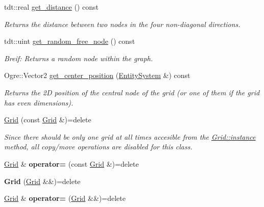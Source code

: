 \begin{DoxyCompactItemize}
tdt\+::real \hyperlink{class_grid_a33f2b46b962d2d6bd0681c2d733ab76a}{get\+\_\+distance} () const 
\begin{DoxyCompactList}\small\item\em Returns the distance between two nodes in the four non-\/diagonal directions. \end{DoxyCompactList}\item 
tdt\+::uint \hyperlink{class_grid_a66fe6e5d96f6ba442605175b2f0e3d93}{get\+\_\+random\+\_\+free\+\_\+node} () const 
\begin{DoxyCompactList}\small\item\em Breif\+: Returns a random node within the graph. \end{DoxyCompactList}\item 
Ogre\+::\+Vector2 \hyperlink{class_grid_ad31b555e83f82a18c1c4a483bf1e57e5}{get\+\_\+center\+\_\+position} (\hyperlink{class_entity_system}{Entity\+System} \&) const 
\begin{DoxyCompactList}\small\item\em Returns the 2D position of the central node of the grid (or one of them if the grid has even dimensions). \end{DoxyCompactList}\item 
\hyperlink{class_grid_a4ec1287c8c59bbcb98f63d50260f6331}{Grid} (const \hyperlink{class_grid}{Grid} \&)=delete
\begin{DoxyCompactList}\small\item\em Since there should be only one grid at all times accesible from the \hyperlink{class_grid_a6ce0a23ca91244b4eee86ba8072cb56d}{Grid\+::instance} method, all copy/move operations are disabled for this class. \end{DoxyCompactList}\item 
\hyperlink{class_grid}{Grid} \& {\bfseries operator=} (const \hyperlink{class_grid}{Grid} \&)=delete\hypertarget{class_grid_afbc27641c46e4ec7adf05e37cd908539}{}\label{class_grid_afbc27641c46e4ec7adf05e37cd908539}

\item 
{\bfseries Grid} (\hyperlink{class_grid}{Grid} \&\&)=delete\hypertarget{class_grid_a58cffb9cc26a21b9664af870b5785614}{}\label{class_grid_a58cffb9cc26a21b9664af870b5785614}

\item 
\hyperlink{class_grid}{Grid} \& {\bfseries operator=} (\hyperlink{class_grid}{Grid} \&\&)=delete\hypertarget{class_grid_a60637a4e5f26f30ff651aa931d8c9e53}{}\label{class_grid_a60637a4e5f26f30ff651aa931d8c9e53}


\end{DoxyCompactItemize}
